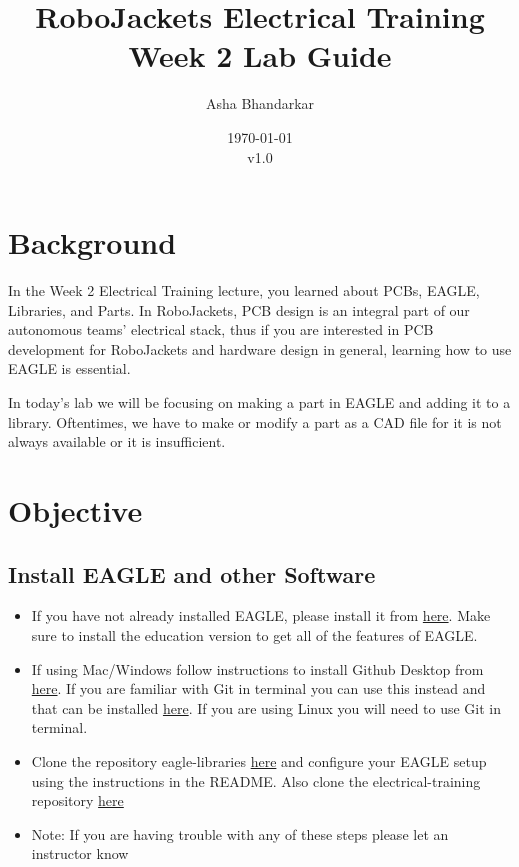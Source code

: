 \documentclass{article}
\title{RoboJackets Electrical Training Week 2 Lab Guide}
\author{Asha Bhandarkar}
\date{\today\\v1.0}
\begin{document}
\maketitle{}
\setcounter{tocdepth}{2}
\tableofcontents
\pagebreak


\section{Background}
In the Week 2 Electrical Training lecture, you learned about PCBs, EAGLE, Libraries, and Parts. In RoboJackets, PCB design is an integral part of our autonomous teams' electrical stack, thus if you are interested in PCB development for RoboJackets and hardware design in general, learning how to use EAGLE is essential.

In today's lab we will be focusing on making a part in EAGLE and adding it to a library. Oftentimes, we have to make or modify a part as a CAD file for it is not always available or it is insufficient. 

\section{Objective}
\subsection{Install EAGLE and other Software}
\begin{itemize}
    \item If you have not already installed EAGLE, please install it from \href{https://www.autodesk.com/education/free-software/eagle}{here}. Make sure to install the education version to get all of the features of EAGLE.
    \item If using Mac/Windows follow instructions to install Github Desktop from \href{https://docs.github.com/en/desktop/getting-started-with-github-desktop/installing-github-desktop}{here}. If you are familiar with Git in terminal you can use this instead and that can be installed \href{https://git-scm.com/book/en/v2/Getting-Started-Installing-Git}{here}. If you are using Linux you will need to use Git in terminal. 
    \item Clone the repository eagle-libraries \href{https://github.com/RoboJackets/eagle-libraries}{here} and configure your EAGLE setup using the instructions in the README. Also clone the electrical-training repository \href{https://github.com/RoboJackets/electrical-training/tree/master}{here}
    \item Note: If you are having trouble with any of these steps please let an instructor know
\end{itemize}
\end{document}
